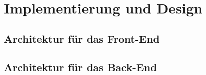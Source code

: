 \chapter{Implementierung und Design}


\section{Architektur für das Front-End}

\section{Architektur für das Back-End}